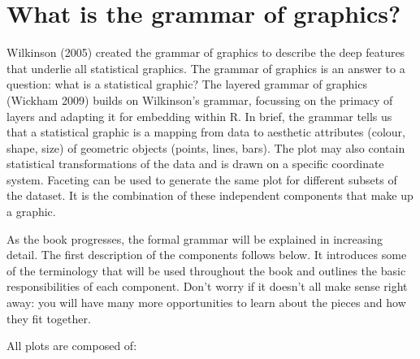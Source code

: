 \section{What is the grammar of graphics?}

Wilkinson (2005) created the grammar of graphics to describe the deep
features that underlie all statistical graphics. The grammar of graphics
is an answer to a question: what is a statistical graphic? The layered
grammar of graphics (Wickham 2009) builds on Wilkinson's grammar,
focussing on the primacy of layers and adapting it for embedding within
R. In brief, the grammar tells us that a statistical graphic is a
mapping from data to aesthetic attributes (colour, shape, size) of
geometric objects (points, lines, bars). The plot may also contain
statistical transformations of the data and is drawn on a specific
coordinate system. Faceting can be used to generate the same plot for
different subsets of the dataset. It is the combination of these
independent components that make up a graphic.

As the book progresses, the formal grammar will be explained in
increasing detail. The first description of the components follows
below. It introduces some of the terminology that will be used
throughout the book and outlines the basic responsibilities of each
component. Don't worry if it doesn't all make sense right away: you will
have many more opportunities to learn about the pieces and how they fit
together.

All plots are composed of:

